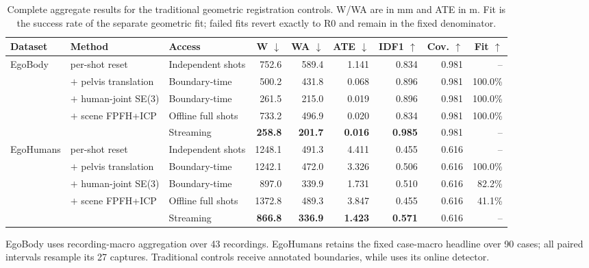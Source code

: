 \begin{table}[t]
  \centering
  \caption{Complete aggregate results for the traditional geometric
  registration controls. W/WA are in mm and ATE in m. Fit is the success rate
  of the separate geometric fit; failed fits revert exactly to R0 and remain
  in the fixed denominator.}
  \label{tab:supp-registration-full}
  \supptablesize
  \setlength{\tabcolsep}{2.7pt}
  \renewcommand{\arraystretch}{1.02}
  \begin{tabular}{lllrrrrrr}
    \toprule
    Dataset & Method & Access & W $\downarrow$ & WA $\downarrow$ & ATE $\downarrow$ & IDF1 $\uparrow$ & Cov. $\uparrow$ & Fit $\uparrow$ \\
    \midrule
    \multirow{5}{*}{EgoBody}
      & \humanthree{} per-shot reset & Independent shots & 752.6 & 589.4 & 1.141 & 0.834 & 0.981 & -- \\
      & $+$ pelvis translation & Boundary-time & 500.2 & 431.8 & 0.068 & 0.896 & 0.981 & 100.0\% \\
      & $+$ human-joint SE(3) & Boundary-time & 261.5 & 215.0 & 0.019 & 0.896 & 0.981 & 100.0\% \\
      & $+$ scene FPFH+ICP & Offline full shots & 733.2 & 496.9 & 0.020 & 0.834 & 0.981 & 100.0\% \\
      & \textbf{\method{}} & Streaming & \textbf{258.8} & \textbf{201.7} & \textbf{0.016} & \textbf{0.985} & 0.981 & -- \\
    \midrule
    \multirow{5}{*}{EgoHumans}
      & \humanthree{} per-shot reset & Independent shots & 1248.1 & 491.3 & 4.411 & 0.455 & 0.616 & -- \\
      & $+$ pelvis translation & Boundary-time & 1242.1 & 472.0 & 3.326 & 0.506 & 0.616 & 100.0\% \\
      & $+$ human-joint SE(3) & Boundary-time & 897.0 & 339.9 & 1.731 & 0.510 & 0.616 & 82.2\% \\
      & $+$ scene FPFH+ICP & Offline full shots & 1372.8 & 489.3 & 3.847 & 0.455 & 0.616 & 41.1\% \\
      & \textbf{\method{}} & Streaming & \textbf{866.8} & \textbf{336.9} & \textbf{1.423} & \textbf{0.571} & 0.616 & -- \\
    \bottomrule
  \end{tabular}
  \vspace{0.5mm}

  \parbox{0.98\textwidth}{\footnotesize EgoBody uses recording-macro aggregation
  over 43 recordings. EgoHumans retains the fixed case-macro headline over 90
  cases; all paired intervals resample its 27 captures. Traditional controls
  receive annotated boundaries, while \method{} uses its online detector.}
\end{table}
